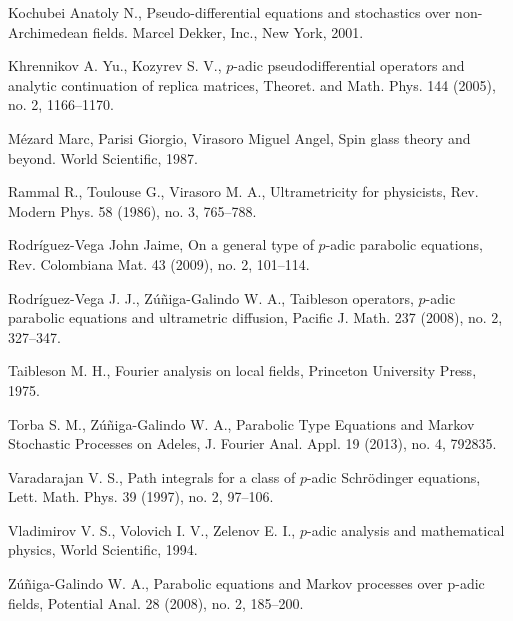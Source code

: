 \documentclass{amsart}\usepackage{amsfonts}
\theoremstyle{plain}
\numberwithin{equation}{section}
\begin{document}
\begin{thebibliography}{99}
Kochubei Anatoly N., Pseudo-differential equations and
stochastics over non-Archimedean fields. Marcel Dekker, Inc., New York, 2001.

Khrennikov A. Yu., Kozyrev S. V., $p$-adic pseudodifferential
operators and analytic continuation of replica matrices, Theoret. and Math.
Phys. 144 (2005), no. 2, 1166--1170.

Mézard Marc, Parisi Giorgio, Virasoro Miguel Angel, Spin glass
theory and beyond. World Scientific, 1987.

Rammal R., Toulouse G., Virasoro M. A., Ultrametricity for
physicists, Rev. Modern Phys. 58 (1986), no. 3, 765--788.

Rodríguez-Vega John Jaime, On a general type of $p$-adic
parabolic equations, Rev. Colombiana Mat. 43 (2009), no. 2, 101--114.

Rodríguez-Vega J. J., Zúñiga-Galindo W. A., Taibleson
operators, $p$-adic parabolic equations and ultrametric diffusion, Pacific J.
Math. 237 (2008), no. 2, 327--347.

Taibleson M. H., Fourier analysis on local fields,
Princeton University Press, 1975.

Torba S. M., Zúñiga-Galindo W. A., Parabolic Type Equations and
Markov Stochastic Processes on Adeles, J. Fourier Anal. Appl. 19 (2013), no.
4, 792835.

Varadarajan V. S., Path integrals for a class of $p$-adic
Schrödinger equations, Lett. Math. Phys. 39 (1997), no. 2, 97--106.

Vladimirov V. S., Volovich I. V., Zelenov E. I., $p$-adic
analysis and mathematical physics, World Scientific, 1994.

Zúñiga-Galindo W. A., Parabolic equations and Markov processes
over p-adic fields, Potential Anal. 28 (2008), no. 2, 185--200.
\end{thebibliography}
\end{document}
